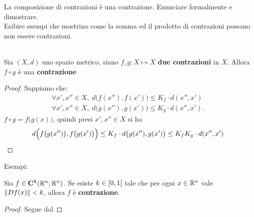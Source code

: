 \begin{exercise}
	La composizione di contrazioni è una contrazione. Enunciare formalmente e dimostrare.\\
	Esibire esempi che mostrino come la somma ed il prodotto di contrazioni possano non essere contrazioni.
	\begin{solution}\hfill\\
		Sia $(X, d)$ uno spazio metrico, siano $f,g:X\mapsto X$ \textbf{due contrazioni} in $X$. Allora $f\circ g$ è una \textbf{contrazione}
		\begin{proof}
			\renewcommand\qedsymbol{$\square$}
			Sappiamo che:
			\begin{equation*}
				\begin{gathered}
					\forall x',x'' \in X,\; d \bigl( f(x''), f(x') \bigr) \leq K_f \cdot d(x'', x')\\
					\forall x',x'' \in X,\; d \bigl( g(x''), g(x') \bigr) \leq K_g \cdot d(x'', x').
				\end{gathered}
			\end{equation*}
			$f \circ g=f\bigl( g(x) \bigr)$, quindi presi $x',x''\in X$ si ha
			\[d \Bigl( f\bigl(g(x'')\bigr), f\bigl(g(x')\bigr) \Bigr) \leq K_f \cdot d \bigl( g(x''), g(x') \bigr) \leq K_f K_g \cdot d(x'',x')\]
		\end{proof}
		\noindent Esempi: %
	\end{solution}
\end{exercise}

\begin{proposition}
	Sia $f \in \mathbf{C^{1}}(\mathbb{R}^n;\mathbb{R}^n)$. Se esiste $k \in \left[0,1\right[$ tale che per ogni $x \in \mathbb{R}^n$ vale $\left\|Df(x)\right\| < k$, allora $f$ è \textbf{contrazione}.
	\begin{proof}
		Segue dal 
	\end{proof}
\end{proposition}

